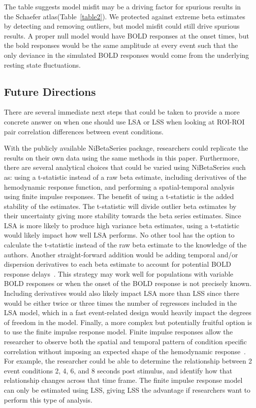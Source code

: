 \documentclass[phd,appendix,figures]{uithesis}
\begin{document}
The table suggests model misfit may be a driving factor for spurious results in the Schaefer atlas(Table~\ref{table2}).
We protected against extreme beta estimates by detecting and removing outliers, but model misfit
could still drive spurious results.
A proper null model would have BOLD responses at the onset times, but the bold responses
would be the same amplitude at every event such that the only deviance in the simulated
BOLD responses would come from the underlying resting state fluctuations.

\subsection*{Future Directions}

There are several immediate next steps that could be taken to provide a more concrete answer
on when one should use LSA or LSS when looking at ROI-ROI pair correlation differences between event
conditions.

With the publicly available NiBetaSeries package, researchers could replicate the
results on their own data using the same methods in this paper.
Furthermore, there are several analytical choices that could be varied using NiBetaSeries such as:
using a t-statistic instead of a raw beta estimate, including derivatives of the hemodynamic response function,
and performing a spatial-temporal analysis using finite impulse responses.
The benefit of using a t-statistic is the added stability of the estimates.
The t-statistic will divide outlier beta estimates by their uncertainty giving more stability
towards the beta series estimates.
Since LSA is more likely to produce high variance beta estimates, using a t-statistic would likely impact
how well LSA performs.
No other tool has the option to calculate the t-statistic instead of the raw beta estimate to the knowledge
of the authors.
Another straight-forward addition would be adding temporal and/or dispersion derivatives to each beta
estimate to account for potential BOLD response delays~\cite{Calhoun2004,Gottlich2015}.
This strategy may work well for populations with variable BOLD responses or when the onset of the BOLD
response is not precisely known.
Including derivatives would also likely impact LSA more than LSS since there would be either twice or
three times the number of regressors included in the LSA model, which in a fast event-related design
would heavily impact the degrees of freedom in the model.
Finally, a more complex but potentially fruitful option is to use the finite impulse response model.
Finite impulse responses allow the researcher to observe both the spatial and temporal pattern of
condition specific correlation without imposing an expected shape of the hemodynamic response~\cite{Turner2012a}.
For example, the researcher could be able to determine the relationship between 2 event conditions
2, 4, 6, and 8 seconds post stimulus, and identify how that relationship changes across
that time frame.
The finite impulse response model can only be estimated using LSS, giving LSS the advantage if researchers
want to perform this type of analysis.
\end{document}
